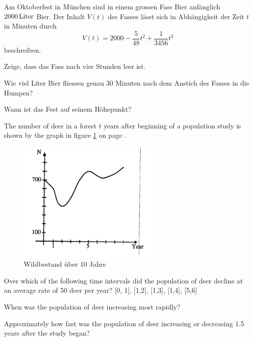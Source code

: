 \documentclass[%
11pt,%
twoside,%
titlepage,%
german,%
headsepline%
]{scrartcl}
\begin{document}
\begin{ueb}
Am
Oktoberfest in M\"unchen sind in einem grossen Fass Bier anf\"anglich $\unit[2000]{Liter}$ Bier. Der Inhalt $V(t)$ des Fasses l\"asst sich in Abh\"angigkeit der Zeit $t$ in Minuten durch
$$V(t)=2000-\frac{5}{48}t^2+\frac{1}{3456}t^3$$
beschreiben.
\begin{enumeratea}
\item Zeige, dass das Fass nach vier Stunden leer ist.
\item Wie viel Liter Bier fliessen genau 30 Minuten nach dem Anstich des Fasses in die Humpen?
\item Wann ist das Fest auf seinem \glqq H\"ohepunkt\grqq?
\end{enumeratea}
\end{ueb}

\begin{ueb}[Wildsaison]
The
number of deer in a forest $t$ years after beginning of a population study is shown by the graph in figure \ref{deer} on page \pageref{deer}.

\begin{figure}
\begin{center}
\includegraphics[width=0.618\textwidth,angle=0.8]{pictures/deer}
\end{center}
\caption{Wildbestand \"uber 10 Jahre}\label{deer}
\end{figure}

\begin{enumeratea}
\item Over which of the following time intervals did the population of deer decline at an average rate of 50 deer per year? [0, 1], [1,2], [1,3], [1,4], [5,6]
\item When was the population of deer increasing most rapidly?
\item Approximately how fast was the population of deer increasing or decreasing 1.5 years after the study began?
\end{enumeratea}
\end{ueb}
\end{document}
